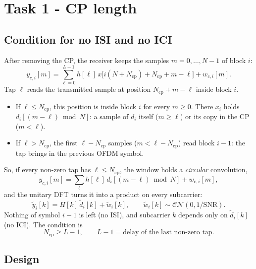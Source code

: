 \documentclass[11pt,a4paper]{article}
\newcommand{\Ncp}{N_{\mathrm{cp}}}
\newcommand{\SNR}{\mathrm{SNR}}
\newcommand{\yt}{\tilde{y}}
\newcommand{\dt}{\tilde{d}}
\newcommand{\wt}{\tilde{w}}
\begin{document}
\section{Task 1 - CP length}
\label{sec:task1}

\subsection{Condition for no ISI and no ICI}

After removing the CP, the receiver keeps the samples $m = 0, \ldots, N-1$ of block $i$:
\begin{equation}
  y_{c,i}[m] = \sum_{\ell=0}^{L-1} h[\ell]\, x\big[i(N+\Ncp) + \Ncp + m - \ell\big] + w_{c,i}[m].
  \label{eq:window}
\end{equation}
Tap $\ell$ reads the transmitted sample at position $\Ncp + m - \ell$ inside block $i$.
\begin{itemize}
  \item If $\ell \le \Ncp$, this position is inside block $i$ for every $m \ge 0$. There $x_i$ holds
        $d_i[(m - \ell) \bmod N]$: a sample of $d_i$ itself ($m \ge \ell$) or its copy in the CP ($m < \ell$).
  \item If $\ell > \Ncp$, the first $\ell - \Ncp$ samples ($m < \ell - \Ncp$) read block $i-1$:
        the tap brings in the previous OFDM symbol.
\end{itemize}
So, if every non-zero tap has $\ell \le \Ncp$, the window holds a \emph{circular} convolution,
\begin{equation}
  y_{c,i}[m] = \sum_{\ell} h[\ell]\, d_i[(m - \ell) \bmod N] + w_{c,i}[m],
\end{equation}
and the unitary DFT turns it into a product on every subcarrier:
\begin{equation}
  \yt_i[k] = H[k]\, \dt_i[k] + \wt_i[k], \qquad \wt_i[k] \sim \mathcal{CN}(0, 1/\SNR).
  \label{eq:flat}
\end{equation}
Nothing of symbol $i-1$ is left (no ISI), and subcarrier $k$ depends only on $\dt_i[k]$ (no ICI).
The condition is
\begin{equation}
  \Ncp \ge L - 1, \qquad L - 1 = \text{delay of the last non-zero tap}.
  \label{eq:condition}
\end{equation}

\subsection{Design}
\end{document}

